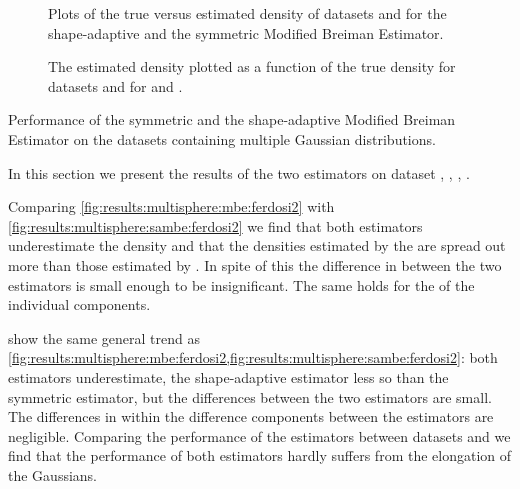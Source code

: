 \begin{figure}
	\centering
	
	\caption{Plots of the true versus estimated density of datasets \ferdosiTwo and \baakmanTwo for the shape-adaptive and the symmetric Modified Breiman Estimator.}
	\label{fig:results:multiSphere:two:comparativePlots}
\end{figure}

\begin{figure}
	\centering
	
	\caption{The estimated density plotted as a function of the true density for datasets \ferdosiThree and \baakmanThree for \mbe and \sambe.}
	\label{fig:results:multiSphere:three:comparativePlots}
\end{figure}

\begin{table}
	\centering
	
	\caption{Performance of the symmetric and the shape-adaptive Modified Breiman Estimator on the datasets containing multiple Gaussian distributions.} 	
	\label{tab:results:multiSphere:mse}
\end{table}

	In this section we present the results of the two estimators on dataset \ferdosiTwo, \baakmanTwo, \ferdosiThree, \baakmanThree.

	Comparing \cref{fig:results:multisphere:mbe:ferdosi2} with \cref{fig:results:multisphere:sambe:ferdosi2} we find that both estimators underestimate the density and that the densities estimated by the \sambe are spread out more than those estimated by \mbe. In spite of this the difference in \mse between the two estimators is small enough to be insignificant. 
	The same holds for the \mse of the individual components.

	 show the same general trend as \cref{fig:results:multisphere:mbe:ferdosi2,fig:results:multisphere:sambe:ferdosi2}: both estimators underestimate, the shape-adaptive estimator less so than the symmetric estimator, but the differences between the two estimators are small. 
	The differences in \MSE within the difference components between the estimators are negligible. 
	Comparing the performance of the estimators between datasets \ferdosiTwo and \baakmanTwo we find that the performance of both estimators hardly suffers from the elongation of the Gaussians. 







